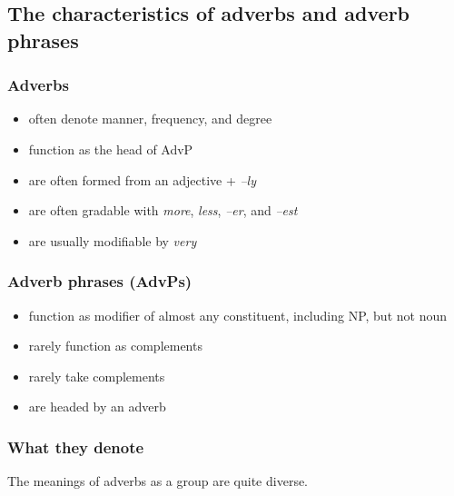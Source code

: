 \subsection{The characteristics of adverbs and adverb phrases}

\subsubsection*{Adverbs}
\begin{itemize}
    \item often denote manner, frequency, and degree
    \item function as the head of AdvP
    \item are often formed from an adjective + \textit{--ly}
    \item are often gradable with \textit{more}, \textit{less}, \textit{--er}, and \textit{--est}
    \item are usually modifiable by \textit{very} 
\end{itemize}

\subsubsection*{Adverb phrases (AdvPs)} \label{sec:advps}

\begin{itemize}
    \item function as modifier of almost any constituent, including NP, but not noun
    \item rarely function as complements
    \item rarely take complements
    \item are headed by an adverb
\end{itemize}

\subsubsection*{What they denote}

The meanings of adverbs as a group are quite diverse.

